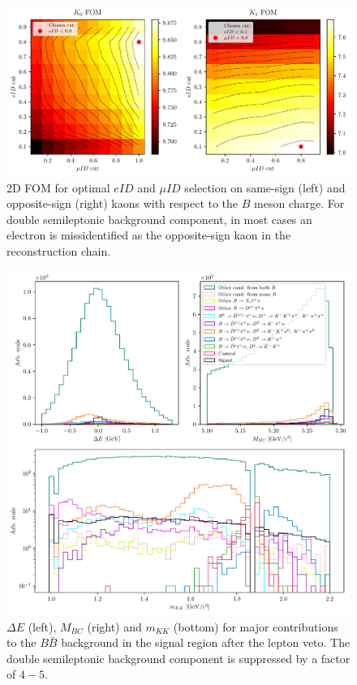 \begin{figure}[H]
	\centering
	\captionsetup{width=0.8\linewidth}
	\includegraphics[width=\linewidth]{fig/lepVeto}
	\caption{2D FOM for optimal $eID$ and $\mu ID$ selection on same-sign (left) and opposite-sign (right) kaons with respect to the $B$ meson charge. For double semileptonic background component, in most cases an electron is missidentified as the opposite-sign kaon in the reconstruction chain.}
	\label{fig:lepVeto}
\end{figure} 

\begin{figure}[H]
	\centering
	\captionsetup{width=0.8\linewidth}
	\includegraphics[width=\linewidth]{fig/sig_BKG_composition_all_after}
	\caption{$\Delta E$ (left), $M_{BC}$ (right) and $m_{KK}$ (bottom) for major contributions to the $B \bar B$ background in the signal region after the lepton veto. The double semileptonic background component is suppressed by a factor of $4-5$.}
	\label{fig:sig_bkg_all_after}
\end{figure} 

